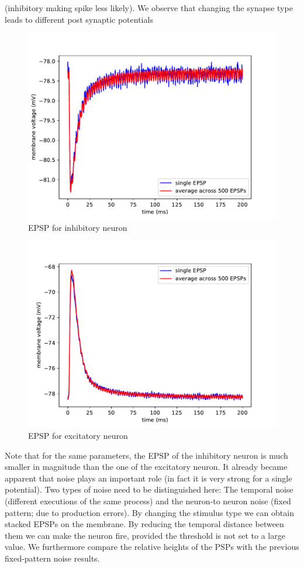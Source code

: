 \documentclass[a4paper,twocolumn]{article}
\begin{document}
(inhibitory making spike less likely).  We observe that changing the synapse type 
leads to different post synaptic potentials
\begin{figure}[ht]
    \centering
    \includegraphics[width=.5\textwidth]{figures/epsp_inh_fall_03_out_05.pdf}
    \caption{EPSP for inhibitory neuron}
    \label{fig:feed-forward}
\end{figure}
\begin{figure}[ht]
    \centering
    \includegraphics[width=.5\textwidth]{figures/epsp_exc_fall_03_out_05.pdf}
    \caption{EPSP for excitatory neuron}
    \label{fig:feed-forward}
\end{figure}
Note that for the same parameters,  the EPSP of the inhibitory neuron is much 
smaller in magnitude than the one of the excitatory neuron.
It already became apparent that noise plays an important role (in fact it is very 
strong for a single potential).  Two types of noise need to be distinguished here: 
The temporal noise (different executions of the same process) and the neuron-to 
neuron noise (fixed pattern; due to production errors).
By changing the stimulus type we can obtain stacked EPSPs on the membrane.  By 
reducing the temporal distance between them we can make the neuron fire, provided 
the threshold is not set to a large value.  We furthermore compare the relative 
heights of the PSPs with the previous fixed-pattern noise results.
\end{document}
